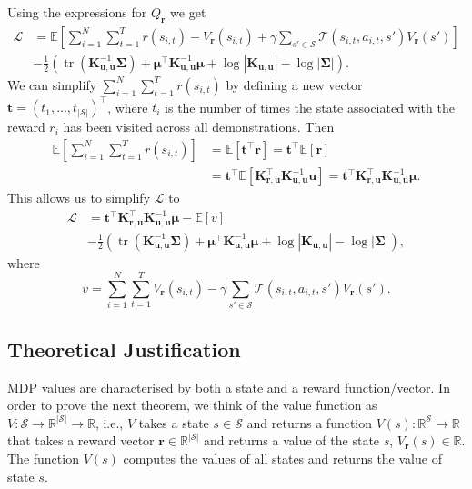 \documentclass{mpaper}
\DeclareMathOperator{\tr}{tr}
\newcommand{\V}{V_{\mathbf{r}}}
\newcommand{\Kuu}{\mathbf{K}_{\mathbf{u},\mathbf{u}}}
\newcommand{\Kru}{\mathbf{K}_{\mathbf{r},\mathbf{u}}}
\begin{document}
Using the expressions for $Q_{\mathbf{r}}$ we get
\begin{align*}
  \mathcal{L} &= \mathbb{E}\left[\sum_{i=1}^N \sum_{t=1}^T r(s_{i,t}) - \V(s_{i,t}) + \gamma\sum_{s' \in \mathcal{S}} \mathcal{T}(s_{i,t}, a_{i,t}, s')\V(s') \right] \\
              &- \frac{1}{2} \left(\tr \left( \Kuu^{-1}\bm\Sigma \right) + \bm\mu^\intercal\Kuu^{-1}\bm\mu + \log |\Kuu| - \log |\bm\Sigma| \right).
\end{align*}
We can simplify $\sum_{i=1}^N\sum_{t=1}^Tr(s_{i,t})$ by defining a new vector
$\mathbf{t} = (t_1, \dots, t_{|\mathcal{S}|})^\intercal$, where $t_i$ is the
number of times the state associated with the reward $r_i$ has been visited
across all demonstrations. Then
\begin{align*}
  \mathbb{E} \left[ \sum_{i=1}^N\sum_{t=1}^Tr(s_{i,t}) \right] &= \mathbb{E}[\mathbf{t}^\intercal\mathbf{r}] = \mathbf{t}^\intercal\mathbb{E}[\mathbf{r}] \\
                                                               &= \mathbf{t}^\intercal\mathbb{E}\left[\Kru^\intercal\Kuu^{-1}\mathbf{u}\right] = \mathbf{t}^\intercal\Kru^\intercal\Kuu^{-1}\bm\mu.
\end{align*}
This allows us to simplify $\mathcal{L}$ to
\begin{align*}
  \mathcal{L} &= \mathbf{t}^\intercal\Kru^\intercal\Kuu^{-1}\bm\mu - \mathbb{E}[v] \\
              &- \frac{1}{2} \left(\tr \left( \Kuu^{-1}\bm\Sigma \right) + \bm\mu^\intercal\Kuu^{-1}\bm\mu + \log |\Kuu| - \log |\bm\Sigma| \right),
\end{align*}
where
\[
  v = \sum_{i=1}^N \sum_{t=1}^T \V(s_{i,t}) - \gamma\sum_{s' \in \mathcal{S}}
  \mathcal{T}(s_{i,t}, a_{i,t}, s')\V(s').
\]

\subsection{Theoretical Justification}

MDP values are characterised by both a state and a reward function/vector. In
order to prove the next theorem, we think of the value function as $V :
\mathcal{S} \to \mathbb{R}^{|\mathcal{S}|} \to \mathbb{R}$, i.e., $V$ takes a
state $s \in \mathcal{S}$ and returns a function $V(s) :
\mathbb{R}^{\mathcal{S}} \to \mathbb{R}$ that takes a reward vector $\mathbf{r}
\in \mathbb{R}^{|\mathcal{S}|}$ and returns a value of the state $s$,
$\V(s) \in \mathbb{R}$. The function $V(s)$ computes the values of
all states and returns the value of state $s$.
\end{document}
